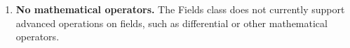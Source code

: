 

\begin{enumerate}

\item {\bf No mathematical operators.}  The Fields class does not 
currently support advanced
operations on fields, such as differential or other
mathematical operators.

\end{enumerate}



